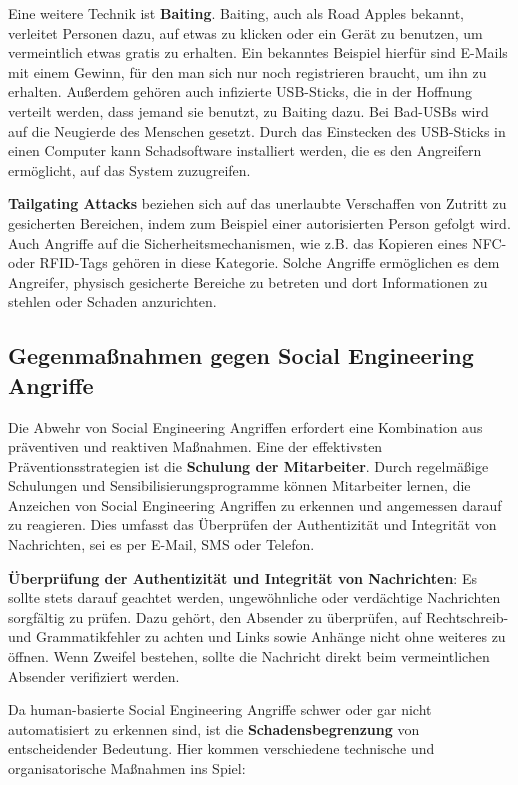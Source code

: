 Eine weitere Technik ist \textbf{Baiting}.
Baiting, auch als Road Apples bekannt, verleitet Personen dazu, auf etwas zu klicken oder ein Gerät zu benutzen, um vermeintlich etwas gratis zu erhalten.
Ein bekanntes Beispiel hierfür sind E-Mails mit einem Gewinn, für den man sich nur noch registrieren braucht, um ihn zu erhalten.
Außerdem gehören auch infizierte USB-Sticks, die in der Hoffnung verteilt werden, dass jemand sie benutzt, zu Baiting dazu.
Bei Bad-USBs wird auf die Neugierde des Menschen gesetzt.
Durch das Einstecken des USB-Sticks in einen Computer kann Schadsoftware installiert werden, die es den Angreifern ermöglicht, auf das System zuzugreifen.

\textbf{Tailgating Attacks} beziehen sich auf das unerlaubte Verschaffen von Zutritt zu gesicherten Bereichen, indem zum Beispiel einer autorisierten Person gefolgt wird.
Auch Angriffe auf die Sicherheitsmechanismen, wie z.B. das Kopieren eines NFC- oder RFID-Tags gehören in diese Kategorie.
Solche Angriffe ermöglichen es dem Angreifer, physisch gesicherte Bereiche zu betreten und dort Informationen zu stehlen oder Schaden anzurichten.

\subsection{Gegenmaßnahmen gegen Social Engineering Angriffe}\label{subsec:gegenmassnahmen-gegen-social-engineering-angriffe}
Die Abwehr von Social Engineering Angriffen erfordert eine Kombination aus präventiven und reaktiven Maßnahmen.
Eine der effektivsten Präventionsstrategien ist die \textbf{Schulung der Mitarbeiter}.
Durch regelmäßige Schulungen und Sensibilisierungsprogramme können Mitarbeiter lernen, die Anzeichen von Social Engineering Angriffen zu erkennen und angemessen darauf zu reagieren.
Dies umfasst das Überprüfen der Authentizität und Integrität von Nachrichten, sei es per E-Mail, SMS oder Telefon.

\textbf{Überprüfung der Authentizität und Integrität von Nachrichten}: Es sollte stets darauf geachtet werden, ungewöhnliche oder verdächtige Nachrichten sorgfältig zu prüfen.
Dazu gehört, den Absender zu überprüfen, auf Rechtschreib- und Grammatikfehler zu achten und Links sowie Anhänge nicht ohne weiteres zu öffnen.
Wenn Zweifel bestehen, sollte die Nachricht direkt beim vermeintlichen Absender verifiziert werden.

Da human-basierte Social Engineering Angriffe schwer oder gar nicht automatisiert zu erkennen sind, ist die \textbf{Schadensbegrenzung} von entscheidender Bedeutung.
Hier kommen verschiedene technische und organisatorische Maßnahmen ins Spiel:

